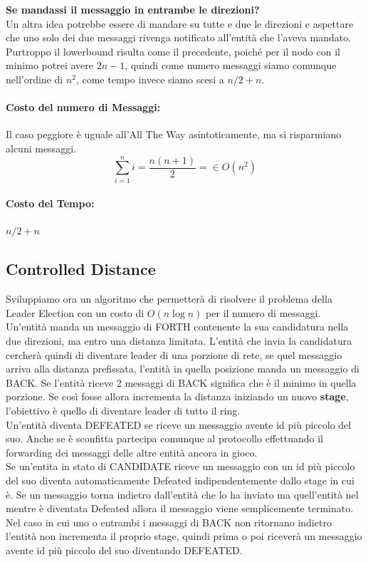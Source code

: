 \textbf{Se mandassi il messaggio in entrambe le direzioni?}\\
Un altra idea potrebbe essere di mandare su tutte e due le direzioni e aspettare
che uno solo dei due messaggi rivenga notificato all'entità che l'aveva
mandato.\\
Purtroppo il lowerbound risulta come il precedente, poiché per il nodo con il
minimo potrei avere $2n - 1$, quindi come numero messaggi siamo comunque
nell'ordine di $n^2$, come tempo invece siamo scesi a $n/2 + n$.

\paragraph{Costo del numero di Messaggi:} Il caso peggiore è uguale all'All The Way
asintoticamente, ma si risparmiano alcuni messaggi.
$$\sum_{i=1}^{n} i = \frac{n(n+1)}{2} =  \in O(n^2)$$

\paragraph{Costo del Tempo:} $n/2 + n$\\


\subsection{Controlled Distance}
Sviluppiamo ora un algoritmo che permetterà di risolvere il problema della
Leader Election con un costo di $O(n \log n)$ per il numero di messaggi.
Un'entità manda un messaggio di FORTH contenente la sua candidatura nella due
direzioni, ma entro una distanza limitata. L'entità che invia la candidatura
cercherà quindi di diventare leader di una porzione di rete, se quel messaggio
arriva alla distanza prefissata, l'entità in quella posizione manda un messaggio
di BACK. Se l'entità riceve 2 messaggi di BACK significa che è il minimo in
quella porzione. Se così fosse allora incrementa la distanza iniziando un nuovo
\textbf{stage}, l'obiettivo è quello di diventare leader di tutto il ring.\\
Un'entità diventa DEFEATED se riceve un messaggio avente id più piccolo del suo.
Anche se è sconfitta partecipa comunque al protocollo effettuando il forwarding
dei messaggi delle altre entità ancora in gioco.\\
Se un'entita in stato di CANDIDATE riceve un messaggio con un id più piccolo del
suo diventa automaticamente Defeated indipendentemente dallo stage in cui è. Se
un messaggio torna indietro dall'entità che lo ha inviato ma quell'entità nel
mentre è diventata Defeated allora il messaggio viene semplicemente terminato.\\
Nel caso in cui uno o entrambi i messaggi di BACK non ritornano indietro
l'entità non incrementa il proprio stage, quindi prima o poi riceverà un
messaggio avente id più piccolo del suo diventando DEFEATED.

